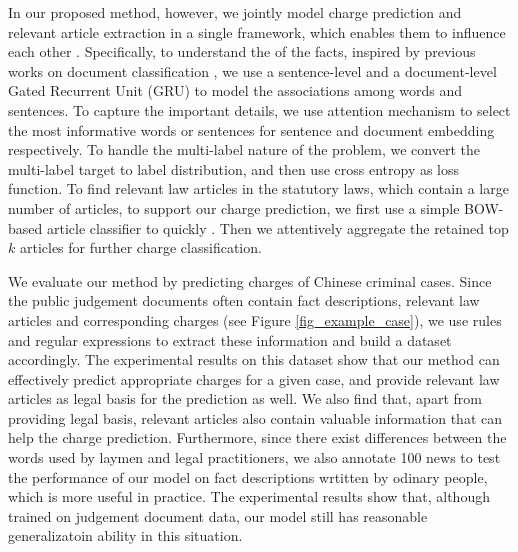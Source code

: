 In our proposed method, however, we jointly model charge prediction and relevant article extraction in a single framework, which enables them to influence each other .
Specifically, to understand the  of the facts, inspired by previous works on document classification \cite{tang2015document,yang2016hierarchical}, we use a sentence-level and a document-level Gated Recurrent Unit (GRU) to model the associations among words and sentences.
To capture the important details, we use attention mechanism to select the most informative words or sentences for sentence and document embedding respectively. 
To handle the multi-label nature of the problem, we convert the multi-label target to label distribution, and then use cross entropy as loss function. 
To find relevant law articles in the statutory laws, which contain a large number of articles, to support our charge prediction, we first use a simple BOW-based article classifier to quickly . Then we attentively aggregate the retained top $k$ articles for further charge classification.

We evaluate our method by predicting charges of Chinese criminal cases. 
Since the public judgement documents often contain fact descriptions, relevant law articles and corresponding charges (see Figure \ref{fig_example_case}), we use rules and regular expressions to extract these information and build a dataset accordingly. 
The experimental results on this dataset show that our method can effectively predict appropriate charges for a given case, and provide relevant law articles as legal basis for the prediction as well. We also find that, apart from providing legal basis, relevant articles also contain valuable information that can help the charge prediction.
Furthermore, since there exist differences between the words used by laymen and legal practitioners, we also annotate 100 news to test the performance of our model on fact descriptions wrtitten by odinary people, which is more useful in practice. The experimental results show that, although trained on judgement document data, our model still has reasonable generalizatoin ability in this situation.

